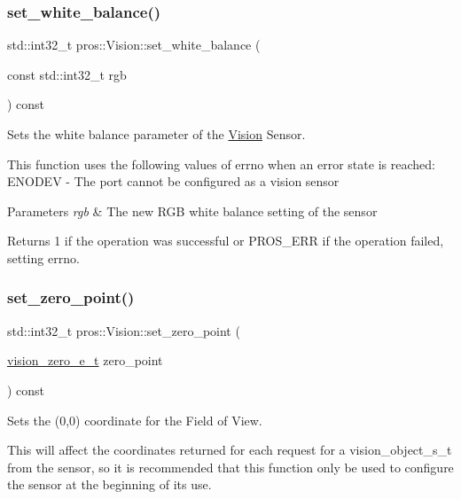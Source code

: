 \subsubsection{\texorpdfstring{set\+\_\+white\+\_\+balance()}{set\_white\_balance()}}
{\footnotesize\ttfamily std\+::int32\+\_\+t pros\+::\+Vision\+::set\+\_\+white\+\_\+balance (\begin{DoxyParamCaption}\item[{const std\+::int32\+\_\+t}]{rgb }\end{DoxyParamCaption}) const}



Sets the white balance parameter of the \hyperlink{classpros_1_1Vision}{Vision} Sensor. 

This function uses the following values of errno when an error state is reached\+: E\+N\+O\+D\+EV -\/ The port cannot be configured as a vision sensor


\begin{DoxyParams}{Parameters}
{\em rgb} & The new R\+GB white balance setting of the sensor\\
\hline
\end{DoxyParams}
\begin{DoxyReturn}{Returns}
1 if the operation was successful or P\+R\+O\+S\+\_\+\+E\+RR if the operation failed, setting errno. 
\end{DoxyReturn}
\mbox{\label{classpros_1_1Vision_a89e0a23b112b8632171ef27cc6f57a6c}} 
\subsubsection{\texorpdfstring{set\+\_\+zero\+\_\+point()}{set\_zero\_point()}}
{\footnotesize\ttfamily std\+::int32\+\_\+t pros\+::\+Vision\+::set\+\_\+zero\+\_\+point (\begin{DoxyParamCaption}\item[{\hyperlink{vision_8h_a2e8bc1c48f8aab12275bfc1868fbbad6}{vision\+\_\+zero\+\_\+e\+\_\+t}}]{zero\+\_\+point }\end{DoxyParamCaption}) const}



Sets the (0,0) coordinate for the Field of View. 

This will affect the coordinates returned for each request for a vision\+\_\+object\+\_\+s\+\_\+t from the sensor, so it is recommended that this function only be used to configure the sensor at the beginning of its use.

